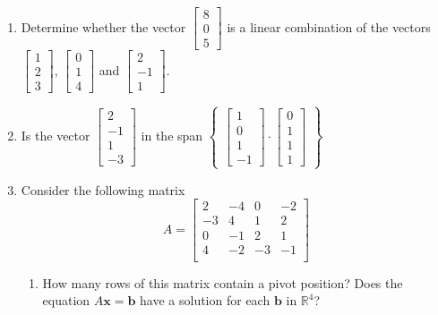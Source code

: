 \documentclass[numbers=noenddot,bibliography=totoc,12pt,sfdefaults=false]{scrartcl}
\begin{document}
    \begin{enumerate}
        \item Determine whether the vector $\begin{bmatrix}
                                                8 \\ 0\\ 5
        \end{bmatrix}$ is a linear combination of the vectors $\begin{bmatrix}
                                                                   1 \\ 2 \\ 3
        \end{bmatrix}$, $\begin{bmatrix}
                             0 \\ 1 \\ 4
        \end{bmatrix}$ and $\begin{bmatrix}
                                2 \\ -1 \\ 1
        \end{bmatrix}$.
        \item Is the vector $\begin{bmatrix}
                                 2 \\ -1 \\ 1 \\ -3
        \end{bmatrix}$ in the span $\begin{Bmatrix}
                                        \begin{bmatrix}
                                            1 \\ 0 \\ 1 \\ -1
                                        \end{bmatrix}\cdot\begin{bmatrix}
                                                              0 \\ 1 \\ 1 \\ 1
                                        \end{bmatrix}
        \end{Bmatrix}$
        \item Consider the following matrix
        $$A=\begin{bmatrix}
                2  & -4 & 0  & -2 \\
                -3 & 4  & 1  & 2  \\
                0  & -1 & 2  & 1  \\
                4  & -2 & -3 & -1 \\
        \end{bmatrix}$$
        \begin{enumerate}
            \item How many rows of this matrix contain a pivot position? Does the equation $A\textbf{x}=\textbf{b}$ have a solution for each $\textbf{b}$ in $\mathbb{R}^4$?
        \end{enumerate}
    \end{enumerate}
\end{document}
